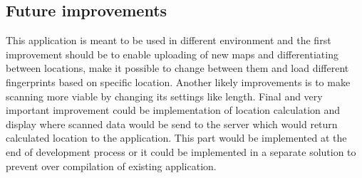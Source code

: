 \subsection{Future improvements}\label{sec:FutureImprovements}
This application is meant to be used in different environment and the first improvement should be to enable uploading of new maps and differentiating between locations, make it possible to change between them and load different fingerprints based on specific location. Another likely improvements is to make scanning more viable by changing its settings like length. Final and very important improvement could be implementation of location calculation and display where scanned data would be send to the server which would return calculated location to the application. This part would be implemented at the end of development process or it could be implemented in a separate solution to prevent over compilation of existing application.